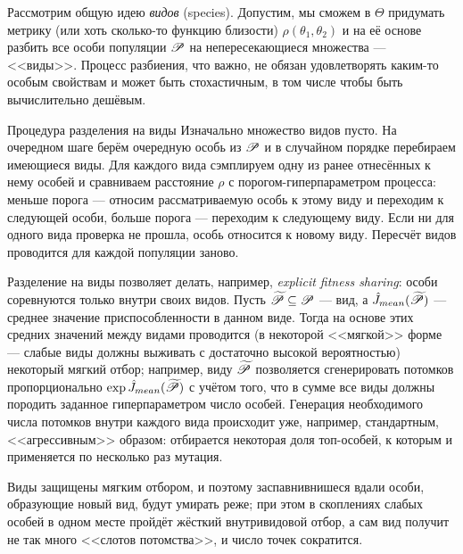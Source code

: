Рассмотрим общую идею \emph{видов} (species). Допустим, мы сможем в $\Theta$ придумать метрику (или хоть сколько-то функцию близости) $\rho(\theta_1, \theta_2)$ и на её основе разбить все особи популяции $\mathscr{P}$ на непересекающиеся множества --- <<виды>>. Процесс разбиения, что важно, не обязан удовлетворять каким-то особым свойствам и может быть стохастичным, в том числе чтобы быть вычислительно дешёвым. 

\begin{exampleBox}[label=ex:species]{Процедура разделения на виды}
Изначально множество видов пусто. На очередном шаге берём очередную особь из $\mathscr{P}$ и в случайном порядке перебираем имеющиеся виды. Для каждого вида сэмплируем одну из ранее отнесённых к нему особей и сравниваем расстояние $\rho$ с порогом-гиперпараметром процесса: меньше порога --- относим рассматриваемую особь к этому виду и переходим к следующей особи, больше порога --- переходим к следующему виду. Если ни для одного вида проверка не прошла, особь относится к новому виду. Пересчёт видов проводится для каждой популяции заново.
\end{exampleBox}

Разделение на виды позволяет делать, например, \emph{explicit fitness sharing}: особи соревнуются только внутри своих видов. Пусть $\widetilde{\mathscr{P}} \subseteq \mathscr{P}$ --- вид, а $\hat{J}_{\mathop{mean}}(\widetilde{\mathscr{P}})$ --- среднее значение приспособленности в данном виде. Тогда на основе этих средних значений между видами проводится (в некоторой <<мягкой>> форме --- слабые виды должны выживать с достаточно высокой вероятностью) некоторый мягкий отбор; например, виду $\widetilde{\mathscr{P}}$ позволяется сгенерировать потомков пропорционально $\exp \hat{J}_{\mathop{mean}}(\widetilde{\mathscr{P}})$ с учётом того, что в сумме все виды должны породить заданное гиперпараметром число особей. Генерация необходимого числа потомков внутри каждого вида происходит уже, например, стандартным, <<агрессивным>> образом: отбирается некоторая доля топ-особей, к которым и применяется по несколько раз мутация.

Виды защищены мягким отбором, и поэтому заспавнивнишеся вдали особи, образующие новый вид, будут умирать реже; при этом в скоплениях слабых особей в одном месте пройдёт жёсткий внутривидовой отбор, а сам вид получит не так много <<слотов потомства>>, и число точек сократится.

